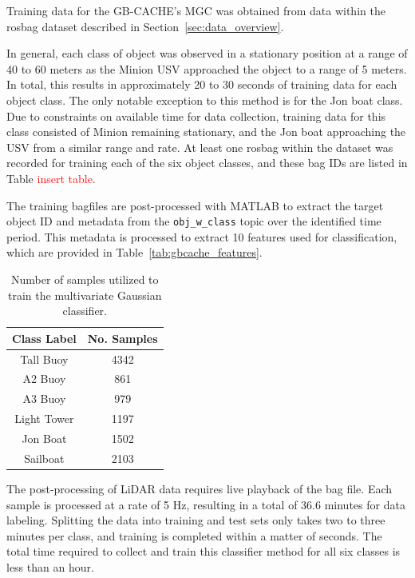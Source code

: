 \documentclass{erauthesis}
\begin{document}
Training data for the GB-CACHE's MGC was obtained from data within the rosbag dataset described in Section~\ref{sec:data_overview}.

In general, each class of object was observed in a stationary position at a range of 40 to 60 meters as the Minion \ac{USV} approached the object to a range of 5 meters. 
In total, this results in approximately 20 to 30 seconds of training data for each object class.
The only notable exception to this method is for the Jon boat class. 
Due to constraints on available time for data collection, training data for this class consisted of Minion remaining stationary, and the Jon boat approaching the \ac{USV} from a similar range and rate.
At least one rosbag within the dataset was recorded for training each of the six object classes, and these bag IDs are listed in Table \textcolor{red}{insert table}.

The training bagfiles are post-processed with MATLAB to extract the target object ID and metadata from the \texttt{obj\_w\_class} topic over the identified time period.
This metadata is processed to extract 10 features used for classification, which are provided in Table~\ref{tab:gbcache_features}.

\begin{table}[htpb]
\centering
\begin{tabular}{cc}
\hline
Class Label & No. Samples \\
\hline
\hline
Tall Buoy   & 4342        \\
A2 Buoy     & 861         \\
A3 Buoy     & 979         \\
Light Tower & 1197        \\
Jon Boat    & 1502        \\
Sailboat    & 2103       \\
\hline
\end{tabular}
\caption{Number of samples utilized to train the multivariate Gaussian classifier.}
\end{table}

The post-processing of LiDAR data requires live playback of the bag file. 
Each sample is processed at a rate of 5 Hz, resulting in a total of 36.6 minutes for data labeling.
Splitting the data into training and test sets only takes two to three minutes per class, and training is completed within a matter of seconds.
The total time required to collect and train this classifier method for all six classes is less than an hour.
\end{document}
